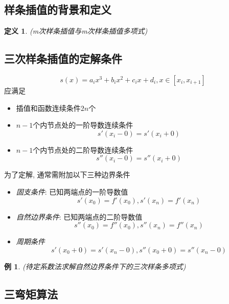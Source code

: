 \documentclass[twoside]{article}
\newtheorem{definition}{定义}[section]
\newtheorem{eg}{例}[section]
\begin{document}
\subsection{样条插值的背景和定义}
\begin{definition}
  (m次样条插值与m次样条插值多项式)
\end{definition}
\subsection{三次样条插值的定解条件}
\begin{equation}
  s(x)=a_i x^3+b_i x^2+c_i x+d_i, x\in[x_i, x_{i+1}]
\end{equation}
应满足
\begin{itemize}
  \item 插值和函数连续条件$2n$个
  \item $n-1$个内节点处的一阶导数连续条件
    \begin{equation}
      s'(x_i-0)=s'(x_i+0)
    \end{equation}
  \item $n-1$个内节点处的二阶导数连续条件
    \begin{equation}
      s''(x_i-0)=s''(x_i+0)
    \end{equation}
\end{itemize}
为了定解, 通常需附加以下三种边界条件
\begin{itemize}
  \item \textit{固支条件}: 已知两端点的一阶导数值
    \begin{equation}
      s'(x_0)=f'(x_0), s'(x_n)=f'(x_n)
    \end{equation}
  \item \textit{自然边界条件}: 已知两端点的二阶导数值
    \begin{equation}
      s''(x_0)=f''(x_0), s''(x_n)=f''(x_n)
    \end{equation}
  \item \textit{周期条件}
    \begin{equation}
      s'(x_0+0)=s'(x_n-0), s''(x_0+0)=s''(x_n-0)
    \end{equation}
\end{itemize}
\begin{eg}
  (待定系数法求解自然边界条件下的三次样条多项式)
\end{eg}
\subsection{三弯矩算法}
\end{document}
